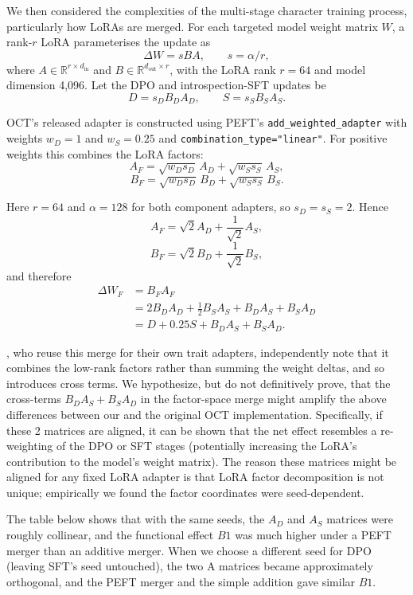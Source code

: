 \documentclass{article}
\begin{document}
We then considered the complexities of the multi-stage character training process, particularly how LoRAs are merged. For each targeted model weight matrix $W$, a rank-$r$ LoRA parameterises the update as
\[
\Delta W = sBA, \qquad s=\alpha/r,
\]
where $A\in\mathbb{R}^{r\times d_{\mathrm{in}}}$ and
$B\in\mathbb{R}^{d_{\mathrm{out}}\times r}$, with the LoRA rank $r=64$ and model dimension 4,096.  Let the DPO and
introspection-SFT updates be
\[
D=s_D B_DA_D,\qquad S=s_S B_SA_S.
\]

OCT's released adapter is constructed using PEFT's
\texttt{add\_weighted\_adapter} with weights $w_D=1$ and $w_S=0.25$
and \texttt{combination\_type="linear"}.  For positive weights this
combines the LoRA factors:
\[
A_F=
\sqrt{w_Ds_D}\,A_D+\sqrt{w_Ss_S}\,A_S,
\]
\[
B_F=
\sqrt{w_Ds_D}\,B_D+\sqrt{w_Ss_S}\,B_S.
\]

Here $r=64$ and $\alpha=128$ for both component adapters, so
$s_D=s_S=2$. Hence
\[
A_F=\sqrt{2}A_D+\frac{1}{\sqrt{2}}A_S,
\]
\[
B_F=\sqrt{2}B_D+\frac{1}{\sqrt{2}}B_S,
\]
and therefore
\[
\begin{aligned}
\Delta W_F
&=B_FA_F\\
&=2B_DA_D+\frac{1}{2}B_SA_S+B_DA_S+B_SA_D\\
&=D+0.25S+B_DA_S+B_SA_D.
\end{aligned}
\]

\citet{baines2026personacartography}, who reuse this merge for their own trait adapters, independently note that it combines the low-rank factors rather than summing the weight deltas, and so introduces cross terms. We hypothesize, but do not definitively prove, that the cross-terms $B_DA_S + B_SA_D$ in the factor-space merge might amplify the above differences between our and the original OCT implementation. Specifically, if these 2 matrices are aligned, it can be shown that the net effect resembles a re-weighting of the DPO or SFT stages (potentially increasing the LoRA's contribution to the model's weight matrix). The reason these matrices might be aligned for any fixed LoRA adapter is that LoRA factor decomposition is not unique; empirically we found the factor coordinates were seed-dependent. 

The table below shows that with the same seeds, the $A_D$ and $A_S$ matrices were roughly collinear, and the functional effect $B1$ was much higher under a PEFT merger than an additive merger. When we choose a different seed for DPO (leaving SFT's seed untouched), the two A matrices became approximately orthogonal, and the PEFT merger and the simple addition gave similar $B1$.
\end{document}
